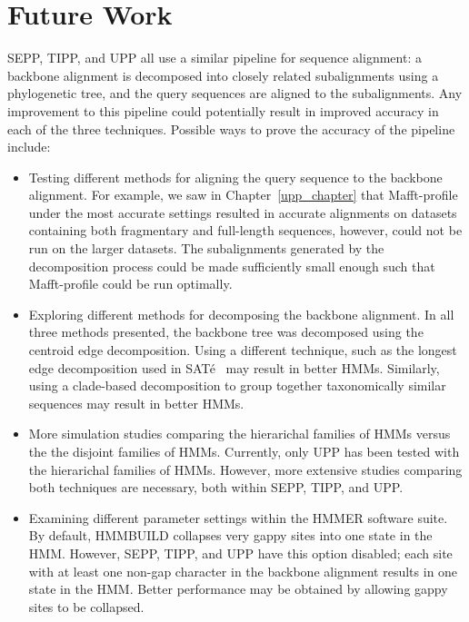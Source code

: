 \section{Future Work}
SEPP, TIPP, and UPP all use a similar pipeline for sequence alignment: a backbone alignment is decomposed into closely related subalignments using a phylogenetic tree, and the query sequences are aligned to the subalignments.  Any improvement to this pipeline could potentially result in improved accuracy in each of the three techniques.  Possible ways to prove the accuracy of the pipeline include:
  
\begin{itemize}
\item Testing different methods for aligning the query sequence to the backbone alignment.  For example, we saw in Chapter~\ref{upp_chapter} that Mafft-profile under the most accurate settings resulted in accurate alignments on datasets containing both fragmentary and full-length sequences, however, could not be run on the larger datasets.  The subalignments generated by the decomposition process could be made sufficiently small enough such that Mafft-profile could be run optimally.
\item Exploring different methods for decomposing the backbone alignment.  In all three methods presented, the backbone tree was decomposed using the centroid edge decomposition.  Using a different technique, such as the longest edge decomposition used in SAT\'{e}~\cite{Liu2009} may result in better HMMs.  Similarly, using a clade-based decomposition to group together taxonomically similar sequences may result in better HMMs.
\item More simulation studies comparing the hierarichal families of HMMs versus the the disjoint families of HMMs.  Currently, only UPP has been tested with the hierarichal families of HMMs.  However, more extensive studies comparing both techniques are necessary, both within SEPP, TIPP, and UPP.
\item Examining different parameter settings within the HMMER software suite.  By default, HMMBUILD collapses very gappy sites into one state in the HMM.  However, SEPP, TIPP, and UPP have this option disabled; each site with at least one non-gap character in the backbone alignment results in one state in the HMM.  Better performance may be obtained by allowing gappy sites to be collapsed.
\end{itemize}

